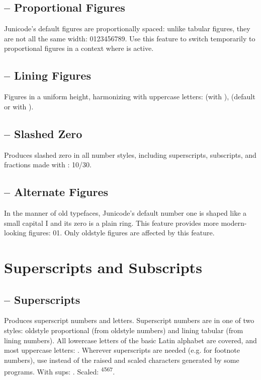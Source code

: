 \subsection{ – Proportional Figures}
Junicode's default figures are proportionally spaced: unlike tabular figures, they are not
all the same width: 0123456789. Use this feature to switch temporarily to proportional figures in a context where
 is active.

\subsection{ – Lining Figures}
Figures in a uniform height, harmonizing with uppercase letters:  (with
),  (default or with ).

\subsection{ – Slashed Zero}
Produces slashed zero in all number styles, including superscripts, subscripts, and fractions made with
: {   
 10/30}.

\subsection{ – Alternate Figures}
In the manner of old typefaces, Junicode's default number one is shaped like a small capital I and
its zero is a plain ring. This feature provides more modern-looking figures:
{01}. Only oldstyle figures
are affected by this feature.

\section{Superscripts and Subscripts}
\subsection{ – Superscripts}
Produces superscript numbers and letters. Superscript numbers are in one of two styles: oldstyle proportional
(from oldstyle numbers) and lining tabular (from lining numbers). All lowercase
letters of the basic Latin alphabet are covered, and most uppercase letters: . Wherever
superscripts are needed (e.g. for footnote numbers), use  instead of the raised and scaled
characters generated by some programs. With sups: . Scaled: \textsuperscript{4567}.

